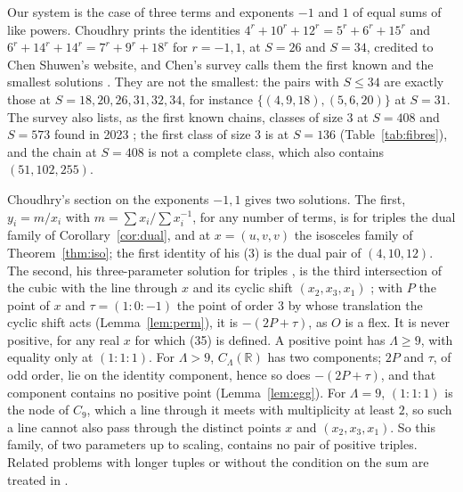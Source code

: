\documentclass[10pt]{article}
\newcommand{\R}{\mathbb{R}}
\begin{document}
Our system is the case of three terms and exponents $-1$ and $1$ of equal sums of like powers. Choudhry \cite[(3), p.~738]{choudhry2011} prints the identities $4^r+10^r+12^r=5^r+6^r+15^r$ and $6^r+14^r+14^r=7^r+9^r+18^r$ for $r=-1,1$, at $S=26$ and $S=34$, credited to Chen Shuwen's website, and Chen's survey calls them the first known and the smallest solutions \cite[Appendix~A.5.1, (A.650)--(A.651)]{chen2025}. They are not the smallest: the pairs with $S\le34$ are exactly those at $S=18,20,26,31,32,34$, for instance $\{(4,9,18),(5,6,20)\}$ at $S=31$. The survey also lists, as the first known chains, classes of size $3$ at $S=408$ and $S=573$ found in 2023 \cite[(A.652)--(A.655)]{chen2025}; the first class of size $3$ is at $S=136$ (Table~\ref{tab:fibres}), and the chain at $S=408$ is not a complete class, which also contains $(51,102,255)$.

Choudhry's section on the exponents $-1,1$ \cite[\S4.1]{choudhry2011} gives two solutions. The first, $y_i=m/x_i$ with $m=\sum x_i/\sum x_i^{-1}$, for any number of terms, is for triples the dual family of Corollary~\ref{cor:dual}, and at $x=(u,v,v)$ the isosceles family of Theorem~\ref{thm:iso}; the first identity of his (3) is the dual pair of $(4,10,12)$. The second, his three-parameter solution for triples \cite[(35)]{choudhry2011}, is the third intersection of the cubic with the line through $x$ and its cyclic shift $(x_2,x_3,x_1)$ \cite[(34)]{choudhry2011}; with $P$ the point of $x$ and $\tau=(1:0:-1)$ the point of order $3$ by whose translation the cyclic shift acts (Lemma~\ref{lem:perm}), it is $-(2P+\tau)$, as $O$ is a flex. It is never positive, for any real $x$ for which (35) is defined. A positive point has $\Lambda\ge9$, with equality only at $(1:1:1)$. For $\Lambda>9$, $C_\Lambda(\R)$ has two components; $2P$ and $\tau$, of odd order, lie on the identity component, hence so does $-(2P+\tau)$, and that component contains no positive point (Lemma~\ref{lem:egg}). For $\Lambda=9$, $(1:1:1)$ is the node of $C_9$, which a line through it meets with multiplicity at least $2$, so such a line cannot also pass through the distinct points $x$ and $(x_2,x_3,x_1)$. So this family, of two parameters up to scaling, contains no pair of positive triples. Related problems with longer tuples or without the condition on the sum are treated in \cite{ulas2013,graham1963,vandoorn2025,browningelsholtz2011,elsholtztao2013}.
\end{document}
